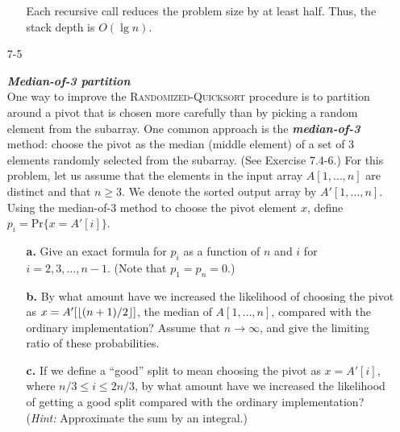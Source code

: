 \begin{enumerate}
\begin{framed}
\begin{enumerate}
{\begin{algorithm}[H]
\SetAlgoNoEnd\DontPrintSemicolon
\BlankLine
{}
\nonl{}
\end{algorithm}

Each recursive call reduces the problem size by at least half. Thus, the stack
depth is $O(\lg n)$.
}
\end{enumerate}
\end{framed}

\newpage

\item[7{-}5]{\textbf{\emph{Median-of-3 partition}}\\
One way to improve the \textsc{Randomized-Quicksort} procedure is to partition
around a pivot that is chosen more carefully than by picking a random element
from the subarray. One common approach is the \textbf{\emph{median-of-3}}
method: choose the pivot as the median (middle element) of a set of 3 elements
randomly selected from the subarray. (See Exercise 7.4-6.) For this problem, let
us assume that the elements in the input array $A[1, \dots, n]$ are distinct and
that $n \ge 3$. We denote the sorted output array by $A'[1, \dots, n]$. Using
the median-of-3 method to choose the pivot element $x$, define
$p_i = \text{Pr}\{x = A'[i]\}$.

\begin{enumerate}
\item[\textbf{a.}]{Give an exact formula for $p_i$ as a function of $n$ and $i$
for $i = 2, 3, \dots, n - 1$. (Note that $p_1 = p_n = 0$.)}

\item[\textbf{b.}]{By what amount have we increased the likelihood of choosing
the pivot as $x = A'[\lfloor(n + 1)/2\rfloor]$, the median of $A[1, \dots, n]$,
compared with the ordinary implementation? Assume that $n \rightarrow \infty$,
and give the limiting ratio of these probabilities.}

\item[\textbf{c.}]{If we define a ``good'' split to mean choosing the pivot as
$x = A'[i]$, where $n/3 \le i \le 2n/3$, by what amount have we increased the
likelihood of getting a good split compared with the ordinary implementation?
(\emph{Hint:} Approximate the sum by an integral.)}


\end{enumerate}}
\end{enumerate}
